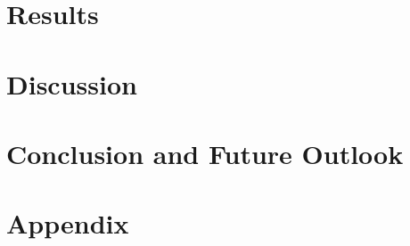 \documentclass[12pt]{report}
\numberwithin{figure}{chapter}
\begin{document}
\chapter{Results}

\chapter{Discussion}

                       
\chapter{Conclusion and Future Outlook}
\newpage


\chapter*{Appendix}
\end{document}
